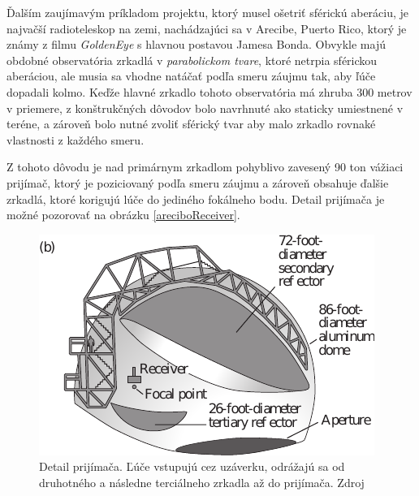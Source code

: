 Ďalším zaujímavým príkladom projektu, ktorý musel ošetriť sférickú aberáciu, je najvačší
radioteleskop na zemi, nachádzajúci sa v Arecibe, Puerto Rico, ktorý je známy z filmu
\textit{GoldenEye} s hlavnou postavou Jamesa Bonda. 
Obvykle majú obdobné observatória zrkadlá v \textit{parabolickom tvare}, ktoré netrpia sférickou
aberáciou, ale musia sa vhodne natáčať podľa smeru záujmu tak, aby ľúče dopadali kolmo. Keďže hlavné zrkadlo tohoto observatória má
zhruba 300 metrov v priemere, z konštrukčných dôvodov bolo navrhnuté ako staticky umiestnené v
teréne, a zároveň
bolo nutné zvoliť sférický tvar aby malo zrkadlo rovnaké vlastnosti z každého smeru.


Z tohoto dôvodu je nad primárnym zrkadlom pohyblivo zavesený 90 ton vážiaci prijímač, ktorý je poziciovaný
podľa smeru záujmu a zároveň obsahuje ďalšie zrkadlá, ktoré korigujú lúče do jediného fokálneho
bodu\cite{hechtoptics}. Detail prijímača je možné pozorovať na obrázku \ref{areciboReceiver}.

\begin{figure}
\includegraphics[scale=0.9]{obrazky-figures/areciboReceiver.pdf}
    \centering \caption{Detail prijímača. Ľúče vstupujú cez uzáverku, odrážajú sa od druhotného a
    následne terciálneho zrkadla až do prijímača. Zdroj\cite{hechtoptics}}
\end{figure}


